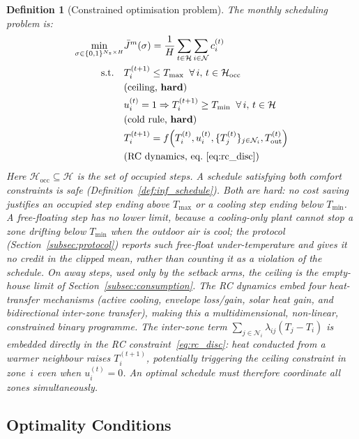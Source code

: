 \documentclass[3p,twocolumn,number]{elsarticle}
\newtheorem{definition}{Definition} \newtheorem{proposition}{Proposition} \newtheorem{remark}{Remark} \newtheorem{observation}{Observation} \newtheorem{corollary}{Corollary}
\newcommand{\sched}{\sigma}
\newcommand{\Tmin}{T_{\min}}
\newcommand{\Tmax}{T_{\max}}
\newcommand{\Tout}{T_{\mathrm{out}}}
\newcommand{\lij}{\lambda_{ij}}
\newcommand{\Jbar}{\bar{J}}
\begin{document}
\begin{definition}[Constrained optimisation problem]
\label{def:cop}
The monthly scheduling problem is:
\begin{equation}
\begin{aligned}
  \underset{\sched\in\{0,1\}^{N_z\times H}}{\min}
  &\Jbar^m(\sched)=\frac{1}{H}
   \sum_{t\in\mathcal{H}}\sum_{i\in\mathcal{N}} c_i^{(t)}\\
  \text{s.t.}\quad
  &T_i^{(t+1)} \le \Tmax
   \;\;\forall\,i,\,t\in\mathcal{H}_{\mathrm{occ}}\\
  &\text{(ceiling, \textbf{hard})}\\
  &u_i^{(t)}=1\Rightarrow T_i^{(t+1)}\ge\Tmin
   \;\;\forall\,i,\,t\in\mathcal{H}\\
  &\text{(cold rule, \textbf{hard})}\\
  &T_i^{(t+1)}=f\!\left(T_i^{(t)},u_i^{(t)},
    \{T_j^{(t)}\}_{j\in\mathcal{N}_i},\Tout^{(t)}\right)\\
  &\text{(RC dynamics, eq.~\eqref{eq:rc_disc})}
\end{aligned}
\label{eq:cop}
\end{equation}
Here $\mathcal{H}_{\mathrm{occ}}\subseteq\mathcal{H}$ is the set of occupied steps. A schedule satisfying both comfort constraints is \emph{safe} (Definition~\ref{def:inf_schedule}). Both are \emph{hard}: no cost saving justifies an occupied step ending above $\Tmax$ or a cooling step ending below $\Tmin$. A free-floating step has no lower limit, because a cooling-only plant cannot stop a zone drifting below $\Tmin$ when the outdoor air is cool; the protocol (Section~\ref{subsec:protocol}) reports such free-float under-temperature and gives it no credit in the clipped mean, rather than counting it as a violation of the schedule. On away steps, used only by the setback arms, the ceiling is the empty-house limit of Section~\ref{subsec:consumption}. The RC dynamics embed four heat-transfer mechanisms (active cooling, envelope loss/gain, solar heat gain, and bidirectional inter-zone transfer), making this a multidimensional, non-linear, constrained binary programme. The inter-zone term $\sum_{j\in\mathcal{N}_i}\lij(T_j-T_i)$ is embedded directly in the RC constraint~\eqref{eq:rc_disc}: heat conducted from a warmer neighbour raises $T_i^{(t+1)}$, potentially triggering the ceiling constraint in zone~$i$ even when $u_i^{(t)}=0$. An optimal schedule must therefore coordinate all zones simultaneously.
\end{definition}
 
\subsection{Optimality Conditions}
\label{subsec:optcond}
 
\end{document}
